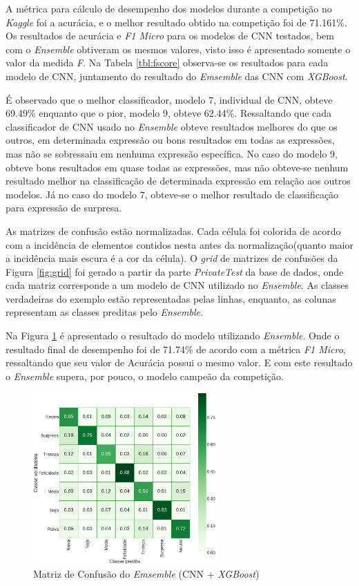A métrica para cálculo de desempenho dos modelos durante a competição no \emph{Kaggle} foi a acurácia, e o melhor resultado obtido na competição foi de 71.161\%. Os resultados de acurácia e \emph{F1 Micro} para os modelos de CNN testados, bem com o \emph{Ensemble} obtiveram os mesmos valores, visto isso é apresentado somente o valor da medida \emph{F}. Na Tabela \ref{tbl:fscore} observa-se os resultados para cada modelo de CNN, juntamento do resultado do \emph{Emsemble} das CNN com \emph{XGBoost}.

É observado que o melhor classificador, modelo 7, individual de CNN, obteve 69.49\% enquanto que o pior, modelo 9, obteve 62.44\%. Ressaltando que cada classificador de CNN usado no \emph{Ensemble} obteve resultados melhores do que os outros, em determinada expressão ou bons resultados em todas as expressões, mas não se sobressaiu em nenhuma expressão específica. No caso do modelo 9, obteve bons resultados em quase todas as expressões, mas não obteve-se nenhum resultado melhor na classificação de determinada expressão em relação aos outros modelos. Já no caso do modelo 7, obteve-se o melhor resultado de classificação para expressão de surpresa.



As matrizes de confusão estão normalizadas. Cada célula foi colorida de acordo com a incidência de elementos contidos nesta antes da normalização(quanto maior a incidência mais escura é a cor da célula). O \emph{grid} de matrizes de confusões da Figura \ref{fig:grid} foi gerado a partir da parte \emph{PrivateTest} da base de dados, onde cada matriz corresponde a um modelo de CNN utilizado no \emph{Ensemble}. As classes verdadeiras do exemplo estão representadas pelas linhas, enquanto, as colunas representam as classes preditas pelo \emph{Ensemble}.

Na Figura \ref{fig:emsemble} é apresentado o resultado do modelo utilizando \emph{Ensemble}. Onde o resultado final de desempenho foi de 71.74\% de acordo com a métrica \emph{F1 Micro}, ressaltando que seu valor de Acurácia possui o mesmo valor. E com este resultado o \emph{Ensemble} supera, por pouco, o modelo campeão da competição.

\begin{figure}[!htb]
    \centering
    \includegraphics[width=7cm]{images/cm_emsemble.png}
    \caption{Matriz de Confusão do \emph{Emsemble} (CNN + \emph{XGBoost})}
    \label{fig:emsemble}
\end{figure}

